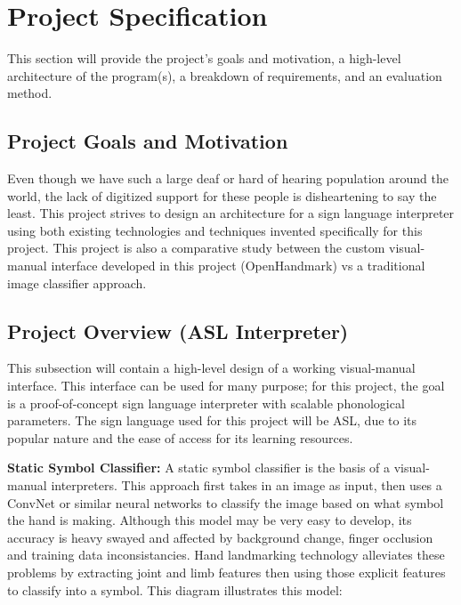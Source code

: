 \documentclass[11pt]{article}
\def\paraskip{\vskip 0.4cm}
\begin{document}
\section{Project Specification}
    This section will provide the project's goals and motivation, a high-level architecture of the program(s), a breakdown of requirements, and an evaluation method.

    \subsection{Project Goals and Motivation}
        Even though we have such a large deaf or hard of hearing population around the world, the lack of digitized support for these people is disheartening to say the least. This project strives to design an architecture for a sign language interpreter using both existing technologies and techniques invented specifically for this project. This project is also a comparative study between the custom visual-manual interface developed in this project (OpenHandmark) vs a traditional image classifier approach.
    
    \subsection{Project Overview (ASL Interpreter)}
        This subsection will contain a high-level design of a working visual-manual interface. This interface can be used for many purpose; for this project, the goal is a proof-of-concept sign language interpreter with scalable phonological parameters. The sign language used for this project will be ASL, due to its popular nature and the ease of access for its learning resources. 

        \paraskip

        \noindent\textbf{Static Symbol Classifier: } A static symbol classifier is the basis of a visual-manual interpreters. This approach first takes in an image as input, then uses a ConvNet or similar neural networks to classify the image based on what symbol the hand is making. Although this model may be very easy to develop, its accuracy is heavy swayed and affected by background change, finger occlusion and training data inconsistancies. Hand landmarking technology alleviates these problems by extracting joint and limb features then using those explicit features to classify into a symbol. This diagram illustrates this model:
\end{document}
